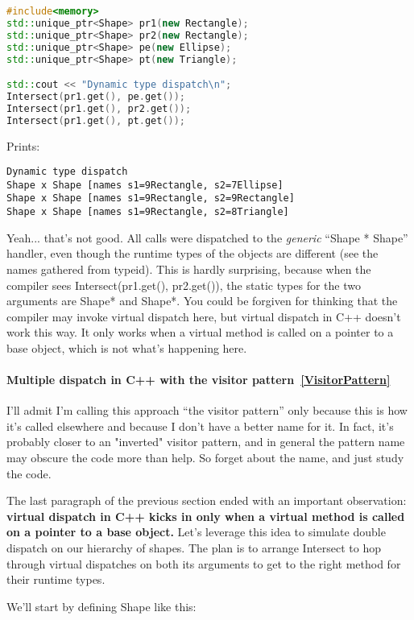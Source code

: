\documentclass{book}
\begin{document}
\begin{lstlisting}[caption={still NOT Multiple dispatch}, language=C++]
#include<memory>
std::unique_ptr<Shape> pr1(new Rectangle);
std::unique_ptr<Shape> pr2(new Rectangle);
std::unique_ptr<Shape> pe(new Ellipse);
std::unique_ptr<Shape> pt(new Triangle);

std::cout << "Dynamic type dispatch\n";
Intersect(pr1.get(), pe.get());
Intersect(pr1.get(), pr2.get());
Intersect(pr1.get(), pt.get());
\end{lstlisting}
Prints:
\begin{verbatim}
Dynamic type dispatch
Shape x Shape [names s1=9Rectangle, s2=7Ellipse]
Shape x Shape [names s1=9Rectangle, s2=9Rectangle]
Shape x Shape [names s1=9Rectangle, s2=8Triangle]
\end{verbatim}
Yeah... that's not good. All calls were dispatched to the \textit{generic} ``Shape * Shape'' handler, even though the runtime types of the objects are different (see the names gathered from typeid).
This is hardly surprising, because when the compiler sees Intersect(pr1.get(), pr2.get()), the static types for the two arguments are Shape* and Shape*.
You could be forgiven for thinking that the compiler may invoke virtual dispatch here, but virtual dispatch in C++ doesn't work this way.
It only works when a virtual method is called on a pointer to a base object, which is not what's happening here.

\paragraph{Multiple dispatch in C++ with the visitor pattern~\ref{VisitorPattern}}

I'll admit I'm calling this approach ``the visitor pattern'' only because this is how it's called elsewhere and because I don't have a better name for it.
In fact, it's probably closer to an "inverted" visitor pattern, and in general the pattern name may obscure the code more than help.
So forget about the name, and just study the code.

The last paragraph of the previous section ended with an important observation: \textbf{virtual dispatch in C++ kicks in only when a virtual method is called on a pointer to a base object.}
Let's leverage this idea to simulate double dispatch on our hierarchy of shapes.
The plan is to arrange Intersect to hop through virtual dispatches on both its arguments to get to the right method for their runtime types.

We'll start by defining Shape like this:
\end{document}
